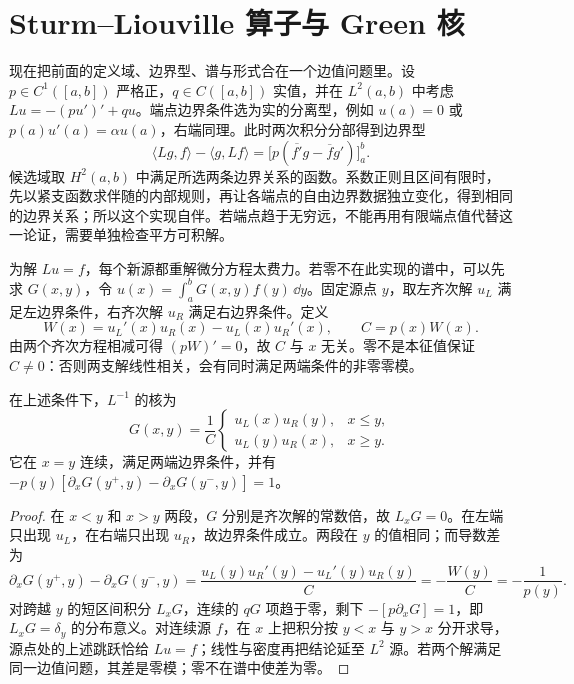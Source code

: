 \section{Sturm--Liouville 算子与 Green 核}

现在把前面的定义域、边界型、谱与形式合在一个边值问题里。设 \(p\in C^1([a,b])\) 严格正，\(q\in C([a,b])\) 实值，并在 \(L^2(a,b)\) 中考虑 \(Lu=-(pu')'+qu\)。端点边界条件选为实的分离型，例如 \(u(a)=0\) 或 \(p(a)u'(a)=\alpha u(a)\)，右端同理。此时两次积分分部得到边界型
\[
\langle Lg,f\rangle-\langle g,Lf\rangle
=\bigl[p(\overline{f'}g-\overline f g')\bigr]_a^b.
\]
候选域取 \(H^2(a,b)\) 中满足所选两条边界关系的函数。系数正则且区间有限时，先以紧支函数求伴随的内部规则，再让各端点的自由边界数据独立变化，得到相同的边界关系；所以这个实现自伴。若端点趋于无穷远，不能再用有限端点值代替这一论证，需要单独检查平方可积解。

为解 \(Lu=f\)，每个新源都重解微分方程太费力。若零不在此实现的谱中，可以先求 \(G(x,y)\)，令 \(u(x)=\int_a^bG(x,y)f(y)\,\dd y\)。固定源点 \(y\)，取左齐次解 \(u_L\) 满足左边界条件，右齐次解 \(u_R\) 满足右边界条件。定义
\[
W(x)=u_L'(x)u_R(x)-u_L(x)u_R'(x),\qquad C=p(x)W(x).
\]
由两个齐次方程相减可得 \((pW)'=0\)，故 \(C\) 与 \(x\) 无关。零不是本征值保证 \(C\ne0\)：否则两支解线性相关，会有同时满足两端条件的非零零模。

\begin{proposition}
在上述条件下，\(L^{-1}\) 的核为
\[
G(x,y)=\frac1C
\begin{cases}
u_L(x)u_R(y),&x\le y,\\
u_L(y)u_R(x),&x\ge y.
\end{cases}
\]
它在 \(x=y\) 连续，满足两端边界条件，并有 \(-p(y)[\partial_xG(y^+,y)-\partial_xG(y^-,y)]=1\)。
\end{proposition}
\begin{proof}
在 \(x<y\) 和 \(x>y\) 两段，\(G\) 分别是齐次解的常数倍，故 \(L_xG=0\)。在左端只出现 \(u_L\)，在右端只出现 \(u_R\)，故边界条件成立。两段在 \(y\) 的值相同；而导数差为
\[
\partial_xG(y^+,y)-\partial_xG(y^-,y)
=\frac{u_L(y)u_R'(y)-u_L'(y)u_R(y)}C=-\frac{W(y)}C=-\frac1{p(y)}.
\]
对跨越 \(y\) 的短区间积分 \(L_xG\)，连续的 \(qG\) 项趋于零，剩下 \(-[p\partial_xG]=1\)，即 \(L_xG=\delta_y\) 的分布意义。对连续源 \(f\)，在 \(x\) 上把积分按 \(y<x\) 与 \(y>x\) 分开求导，源点处的上述跳跃恰给 \(Lu=f\)；线性与密度再把结论延至 \(L^2\) 源。若两个解满足同一边值问题，其差是零模；零不在谱中使差为零。
\end{proof}

